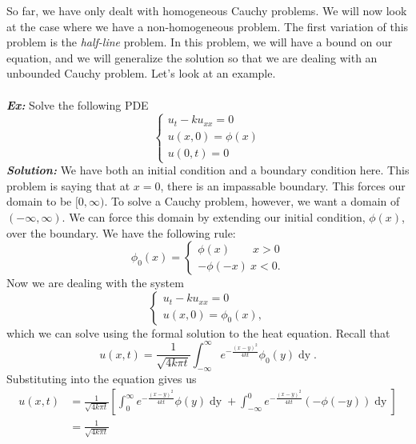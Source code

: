 \documentclass{article}
\begin{document}
\newpage
\indent So far, we have only dealt with homogeneous Cauchy problems. We will now look at the case where we have a non-homogeneous problem. The first variation of this problem is the \textit{half-line} problem. In this problem, we will have a bound on our equation, and we will generalize the solution so that we are dealing with an unbounded Cauchy problem. Let's look at an example.
\noindent\\\\ \textbf{\textit{Ex:}} Solve the following PDE
\[
\begin{cases}
u_{t} - ku_{xx} = 0\\
u(x,0) = \phi(x)\\
u(0,t) = 0
\end{cases}
\]
\indent \textbf{\textit{Solution:}} We have both an initial condition and a boundary condition here. This problem is saying that at $x=0$, there is an impassable boundary. This forces our domain to be $[0,\infty)$. To solve a Cauchy problem, however, we want a domain of $(-\infty,\infty)$. We can force this domain by extending our initial condition, $\phi(x)$, over the boundary. We have the following rule:
\[
\phi_{0}(x) =
\begin{cases}
\phi(x)\quad\quad x>0\\
-\phi(-x)\ x<0.
\end{cases}
\]
Now we are dealing with the system
\[
\begin{cases}
u_{t} - ku_{xx} = 0\\
u(x,0) = \phi_{0}(x),
\end{cases}
\]
which we can solve using the formal solution to the heat equation. Recall that
\[
u(x,t) = \frac{1}{\sqrt{4k\pi t}}\int_{-\infty}^{\infty}e^{-\frac{(x-y)^{2}}{4kt}}\phi_{0}(y)\mathop{dy}.
\]
Substituting into the equation gives us
\begin{align*}
u(x,t) &= \frac{1}{\sqrt{4k\pi t}}\left[\int_{0}^{\infty}e^{-\frac{(x-y)^{2}}{4kt}}\phi(y)\mathop{dy} + \int_{-\infty}^{0}e^{-\frac{(x-y)^{2}}{4kt}}(-\phi(-y))\mathop{dy} \right]\\
&= \frac{1}{\sqrt{4k\pi t}}
\end{align*}
\end{document}
